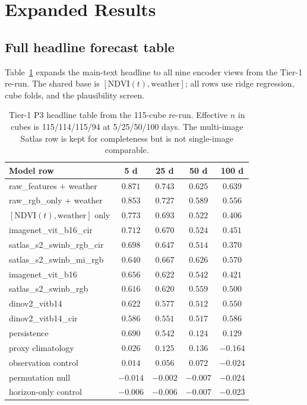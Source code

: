 \section{Expanded Results}

\subsection{Full headline forecast table}
Table~\ref{tab:fullheadline} expands the main-text headline to all nine encoder
views from the Tier-1 re-run. The shared base is $[\mathrm{NDVI}(t),
\mathrm{weather}]$; all rows use ridge regression, cube folds, and the
plausibility screen.

\begin{table}[h]
\centering
\small
\begin{tabular}{lcccc}
\toprule
Model row & 5 d & 25 d & 50 d & 100 d \\
\midrule
raw\_features + weather & $0.871$ & $0.743$ & $0.625$ & $0.639$ \\
raw\_rgb\_only + weather & $0.853$ & $0.727$ & $0.589$ & $0.556$ \\
$[\mathrm{NDVI}(t), \mathrm{weather}]$ only & $0.773$ & $0.693$ & $0.522$ & $0.406$ \\
imagenet\_vit\_b16\_cir & $0.712$ & $0.670$ & $0.524$ & $0.451$ \\
satlas\_s2\_swinb\_rgb\_cir & $0.698$ & $0.647$ & $0.514$ & $0.370$ \\
satlas\_s2\_swinb\_mi\_rgb & $0.640$ & $0.667$ & $0.626$ & $0.570$ \\
imagenet\_vit\_b16 & $0.656$ & $0.622$ & $0.542$ & $0.421$ \\
satlas\_s2\_swinb\_rgb & $0.616$ & $0.620$ & $0.559$ & $0.500$ \\
dinov2\_vitb14 & $0.622$ & $0.577$ & $0.512$ & $0.550$ \\
dinov2\_vitb14\_cir & $0.586$ & $0.551$ & $0.517$ & $0.586$ \\
\midrule
persistence & $0.690$ & $0.542$ & $0.124$ & $0.129$ \\
proxy climatology & $0.026$ & $0.125$ & $0.136$ & $-0.164$ \\
observation control & $0.014$ & $0.056$ & $0.072$ & $-0.024$ \\
permutation null & $-0.014$ & $-0.002$ & $-0.007$ & $-0.024$ \\
horizon-only control & $-0.006$ & $-0.006$ & $-0.007$ & $-0.023$ \\
\bottomrule
\end{tabular}
\caption{Tier-1 P3 headline table from the 115-cube re-run. Effective $n$ in
cubes is 115/114/115/94 at 5/25/50/100 days. The multi-image Satlas row is kept
for completeness but is not single-image comparable.}
\label{tab:fullheadline}
\end{table}

